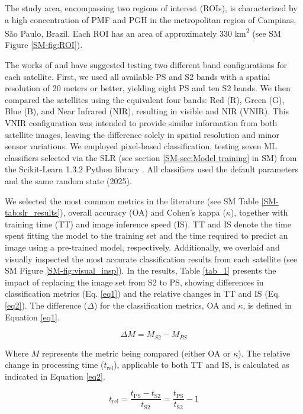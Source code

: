 \documentclass[journal]{IEEEtran}
\begin{document}
The study area, encompassing two regions of interest (ROIs), is characterized by a high concentration of PMF and PGH in the metropolitan region of Campinas, S\~ao Paulo, Brazil. Each ROI has an area of approximately 330 km\textsuperscript{2} (see SM Figure \ref{SM-fig:ROI}).

The works of \cite{Basheer2024} and \cite{Tayer2023} have suggested testing two different band configurations for each satellite. First, we used all available PS and S2 bands with a spatial resolution of 20 meters or better, yielding eight PS and ten S2 bands. We then compared the satellites using the equivalent four bands: Red (R), Green (G), Blue (B), and Near Infrared (NIR), resulting in visible and NIR (VNIR). This VNIR configuration was intended to provide similar information from both satellite images, leaving the difference solely in spatial resolution and minor sensor variations. We employed pixel-based classification, testing seven ML classifiers selected via the SLR (see section \ref{SM-sec:Model training} in SM) from the Scikit-Learn 1.3.2 Python library \cite{Pedregosa2011}. All classifiers used the default parameters and the same random state (2025).

We selected the most common metrics in the literature (see SM Table \ref{SM-tab:slr_results}), overall accuracy (OA) and Cohen's kappa ($\kappa$), together with training time (TT) and image inference speed (IS). TT and IS denote the time spent fitting the model to the training set and the time required to predict an image using a pre-trained model, respectively. Additionally, we overlaid and visually inspected the most accurate classification results from each satellite (see SM Figure \ref{SM-fig:visual_insp}). In the results, Table \ref{tab_1} presents the impact of replacing the image set from S2 to PS, showing differences in classification metrics (Eq. \ref{eq1}) and the relative changes in TT and IS (Eq. \ref{eq2}). The difference ($\Delta$) for the classification metrics, OA and $\kappa$, is defined in Equation \ref{eq1}.

\begin{equation}
\Delta M = M_{S2} - M_{PS}
\label{eq1}
\end{equation}

Where $M$ represents the metric being compared (either OA or $\kappa$). The relative change in processing time ($t_{\text{rel}}$), applicable to both TT and IS, is calculated as indicated in Equation \ref{eq2}.

\begin{equation}
t_{\text{rel}} = \frac{t_{\text{PS}}-t_{\text{S2}}}{t_{\text{S2}}} = \frac{t_{\text{PS}}}{t_{\text{S2}}}-1
\label{eq2}
\end{equation}
\end{document}
